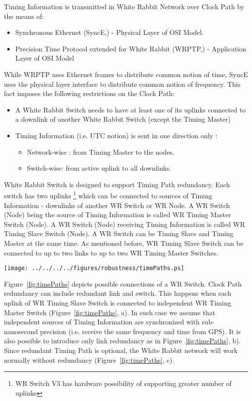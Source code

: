 Timing Information is transmitted in White Rabbit Network over Clock Path by
the means of:
\begin{itemize}
  \item Synchronous Ethernet (SyncE,\cite{SynchE}) - Physical Layer of OSI
Model.
  \item Precision Time Protocol \cite{IEEE1588} extended for White Rabbit
(WRPTP,\cite{WRPTP}) - Application Layer of OSI Model
\end{itemize}
While WRPTP uses Ethernet frames to distribute common notion of time, SyncE
uses the physical layer interface to distribute common notion of frequency. This
fact imposes the following restrictions on the Clock Path:
\begin{itemize}
  \item A White Rabbit Switch needs to have at least one of its uplinks
connected to a downlink of another White Rabbit Switch (except the Timing
Master)
  \item Timing Information (i.e. UTC notion) is sent in one direction only : 
    \begin{itemize}
      \item Network-wise : from Timing Master to the nodes.
      \item Switch-wise: from active uplink to all downlinks.
    \end{itemize}
\end{itemize}

White Rabbit Switch is designed to support Timing Path redundancy. Each switch
has two uplinks \footnote{WR Switch V3 has hardware possibility of supporting
greater number of uplinks} which can be connected to sources of Timing
Information - downlinks of another WR Switch or WR Node. A WR Switch (Node)
being the source of Timing Information is called WR Timing Master Switch (Node).
A WR Switch (Node) receiving Timing Information is called WR Timing Slave Switch
(Node). A WR Switch can be Timing Slave and Timing Master at the same time. As
mentioned before, WR Timing Slave Switch can be connected to up to two links
to up to two WR Timing Master Switches.

\begin{center}
	\texttt{[image: ../../../../figures/robustness/timePaths.ps]}
	\label{fig:timePaths}
\end{center}

Figure~\ref{fig:timePaths} depicts possible connections of a WR Switch. Clock
Path redundancy can include redundant link and switch. This happens when each
uplink of WR Timing Slave Switch is connected to independent WR Timing Master
Switch (Figure~\ref{fig:timePaths}, a). In such case we assume that independent
sources of Timing Information are synchronized with sub-nanosecond precision 
(i.e. receive the same frequency and time from GPS). It is also possible to
introduce only link redundancy as in Figure~\ref{fig:timePaths}, b). Since
redundant Timing Path is optional, the
White Rabbit network will work normally without redundancy
(Figure~\ref{fig:timePaths}, c).


